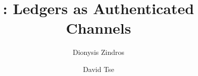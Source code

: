 \title{
  \rollerblade:
  Ledgers as Authenticated Channels
}
\ifanonymous{\iflncs
\author{}\institute{}
\fi}
\else
\author{
  Dionysis Zindros\and
  David Tse
}
\iflncs
{}
\else
{}
\fi
\fi
